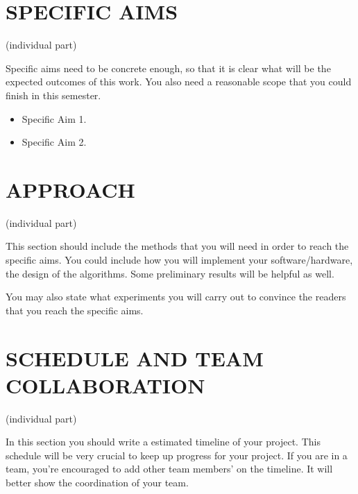 \documentclass[letterpaper, 10 pt, conference]{ieeeconf}  %
\begin{document}
\section{SPECIFIC AIMS}

(individual part)

Specific aims need to be concrete enough, so that it is clear what will be the expected outcomes of this work. You also need a reasonable scope that you could finish in this semester.

\begin{itemize}
\item Specific Aim 1.
\item Specific Aim 2.
\end{itemize}

\section{APPROACH}

(individual part)

This section should include the methods that you will need in order to reach the specific aims. You could include how you will implement your software/hardware, the design of the algorithms. Some preliminary results will be helpful as well. 

You may also state what experiments you will carry out to convince the readers that you reach the specific aims.

\section{SCHEDULE AND TEAM COLLABORATION}

(individual part)

In this section you should write a estimated timeline of your project. This schedule will be very crucial to keep up progress for your project. If you are in a team, you're encouraged to add other team members' on the timeline. It will better show the coordination of your team.
   

\addtolength{\textheight}{-12cm}   %



\end{document}
